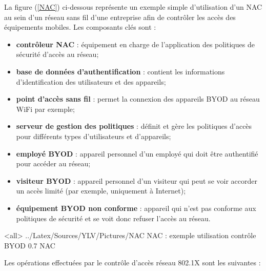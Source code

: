 La figure (\ref{NAC}) ci-dessous représente un exemple simple d'utilisation d'un NAC au sein d'un réseau sans fil d'une entreprise afin de contrôler les accès des équipements mobiles.
Les composants clés sont :
\begin{itemize}
    \item \textbf{contrôleur NAC} : équipement en charge de l'application des politiques de sécurité d'accès au réseau;
    \item \textbf{base de données d'authentification} : contient les informations d'identification des utilisateurs et des appareils;
    \item \textbf{point d'accès sans fil} : permet la connexion des appareils BYOD au réseau WiFi par exemple;
    \item \textbf{serveur de gestion des politiques} : définit et gère les politiques d'accès pour différents types d'utilisateurs et d'appareils;
    \item \textbf{employé BYOD} : appareil personnel d'un employé qui doit être authentifié pour accéder au réseau;
    \item \textbf{visiteur BYOD} : appareil personnel d'un visiteur qui peut se voir accorder un accès limité (par exemple, uniquement à Internet);
    \item \textbf{équipement BYOD non conforme} : appareil qui n'est pas conforme aux politiques de sécurité et se voit donc refuser l'accès au réseau.
    \end{itemize}
\mode<all>{\picframe
{../Latex/Sources/YLV/Pictures/NAC}%
{NAC : exemple utilisation contrôle BYOD} %
{0.7} %
{NAC} %
}

Les opérations effectuées par le contrôle d'accès réseau 802.1X sont les suivantes :


